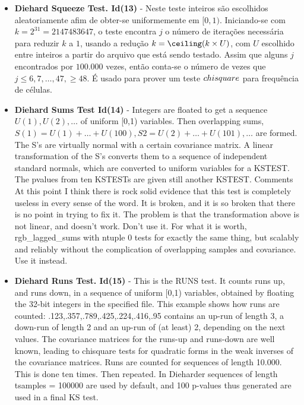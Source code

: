 \begin{itemize}
   \item \textbf{Diehard Squeeze Test. Id(13)} - Neste teste inteiros são escolhidos aleatoriamente afim de obter-se uniformemente em $[0,1)$. Iniciando-se com $k=2^{31} = 2147483647$, o teste encontra $j$  o número de iterações necessária para reduzir $k$ a $1$, usando a redução $k = \ceiling(k \times U)$, com $U$ escolhido entre inteiros a partir do arquivo que está sendo testado. Assim que alguns $j$ encontrados por $100.000$ vezes, então conta-se o número de vezes que $j \leq 6, 7,\dots, 47, \geq 48$. É usado para prover um teste $chi\-square$ para frequência de células.
   
   \item \textbf{Diehard Sums Test Id(14)} - Integers are floated to get a sequence $U(1),U(2),\dots$ of uniform [0,1) variables. Then overlapping sums, $S(1) = U(1)+ \dots + U(100), S2 = U(2)+ \dots +U(101), \dots$ are formed. The S's are virtually normal with a certain covariance matrix.  A linear transformation of the S's converts them to a sequence of independent standard normals, which are converted  to uniform variables for a KSTEST. The p\-values from ten KSTESTs are given still another KSTEST. Comments At this point I think there is rock solid evidence that this test is completely useless in every sense of the word. It is broken, and it is so broken that there is no point in trying to fix it. The problem is that the transformation above is not linear, and doesn't work. Don't use it. For what it is worth, rgb\_lagged\_sums with ntuple 0 tests for exactly the same thing, but scalably and reliably without the complication of overlapping samples and covariance. Use it instead.
   
   \item \textbf{Diehard Runs Test. Id(15)} - This is the RUNS test. It counts runs up, and runs down, in a sequence of uniform [0,1) variables, obtained by floating the 32-bit integers in the specified file. This example    shows how runs are counted:  .123,.357,.789,.425,.224,.416,.95 contains an up-run of length 3, a down-run of length 2 and an  up-run of (at least) 2, depending on the next values.  The     covariance matrices for the runs-up and runs-down are well     known, leading to chisquare tests for quadratic forms in the   weak inverses of the covariance matrices.  Runs are counted    for sequences of length 10.000.  This is done ten times. Then  repeated. In Dieharder sequences of length tsamples = 100000 are used by default, and 100 p-values thus generated are used in a final KS test.
   

\end{itemize}

